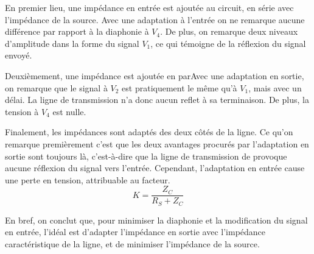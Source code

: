 En premier lieu, une impédance en entrée est ajoutée au circuit, en série avec l'impédance de la source. Avec une adaptation à l'entrée  on ne remarque aucune différence par rapport à la diaphonie à $V_4$. De plus, on remarque deux niveaux d'amplitude dans la forme du signal $V_1$, ce qui témoigne de la réflexion du signal envoyé.

Deuxièmement, une impédance est ajoutée en parAvec une adaptation en sortie, on remarque que le signal à $V_2$ est pratiquement le même qu'à $V_1$, mais avec un délai. La ligne de transmission n'a donc aucun reflet à sa terminaison. De plus, la tension à $V_4$ est nulle.


Finalement, les impédances sont adaptés des deux côtés de la ligne. Ce qu'on remarque premièrement c'est que les deux avantages procurés par l'adaptation en sortie sont toujours là, c'est-à-dire que la ligne de transmission de provoque aucune réflexion du signal vers l'entrée. Cependant, l'adaptation en entrée cause une perte en tension, attribuable au facteur.
\[K = \frac{Z_C}{R_S+Z_C}\]


En bref, on conclut que, pour minimiser la diaphonie et la modification du signal en entrée, l'idéal est d'adapter l'impédance en sortie avec l'impédance caractéristique de la ligne, et de minimiser l'impédance de la source.
